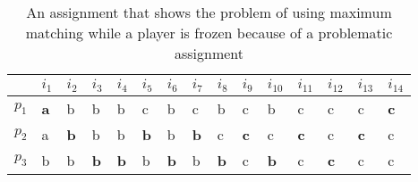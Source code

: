 \documentclass{article}
\begin{document}
\begin{table}[h]
\centering
\begin{tabular}{lllllllllllllll}
                            & $i_1$                           & $i_2$                           & $i_3$                           & $i_4$                           & $i_5$                           & $i_6$                           & $i_7$                           & $i_8$                           & $i_9$                           & $i_{10}$                        & $i_{11}$                        & $i_{12}$                        & $i_{13}$                        & $i_{14}$                        \\ \hline
\multicolumn{1}{|l|}{$p_1$} & \multicolumn{1}{l|}{\textbf{a}} & \multicolumn{1}{l|}{b}          & \multicolumn{1}{l|}{b}          & \multicolumn{1}{l|}{b}          & \multicolumn{1}{l|}{c}          & \multicolumn{1}{l|}{b}          & \multicolumn{1}{l|}{c}          & \multicolumn{1}{l|}{b}          & \multicolumn{1}{l|}{c}          & \multicolumn{1}{l|}{b}          & \multicolumn{1}{l|}{c}          & \multicolumn{1}{l|}{c}          & \multicolumn{1}{l|}{c}          & \multicolumn{1}{l|}{\textbf{c}} \\ \hline
\multicolumn{1}{|l|}{$p_2$} & \multicolumn{1}{l|}{a}          & \multicolumn{1}{l|}{\textbf{b}} & \multicolumn{1}{l|}{b}          & \multicolumn{1}{l|}{b}          & \multicolumn{1}{l|}{\textbf{b}} & \multicolumn{1}{l|}{b}          & \multicolumn{1}{l|}{\textbf{b}} & \multicolumn{1}{l|}{c}          & \multicolumn{1}{l|}{\textbf{c}} & \multicolumn{1}{l|}{c}          & \multicolumn{1}{l|}{\textbf{c}} & \multicolumn{1}{l|}{c}          & \multicolumn{1}{l|}{\textbf{c}} & \multicolumn{1}{l|}{c}          \\ \hline
\multicolumn{1}{|l|}{$p_3$} & \multicolumn{1}{l|}{b}          & \multicolumn{1}{l|}{b}          & \multicolumn{1}{l|}{\textbf{b}} & \multicolumn{1}{l|}{\textbf{b}} & \multicolumn{1}{l|}{b}          & \multicolumn{1}{l|}{\textbf{b}} & \multicolumn{1}{l|}{b}          & \multicolumn{1}{l|}{\textbf{b}} & \multicolumn{1}{l|}{c}          & \multicolumn{1}{l|}{\textbf{b}} & \multicolumn{1}{l|}{c}          & \multicolumn{1}{l|}{\textbf{c}} & \multicolumn{1}{l|}{c}          & \multicolumn{1}{l|}{c}          \\ \hline
\end{tabular}
\caption{An assignment that shows the problem of using maximum matching while a player is frozen because of a problematic assignment}
\label{table:example-maximum-matching-problem}
\end{table}
\end{document}
